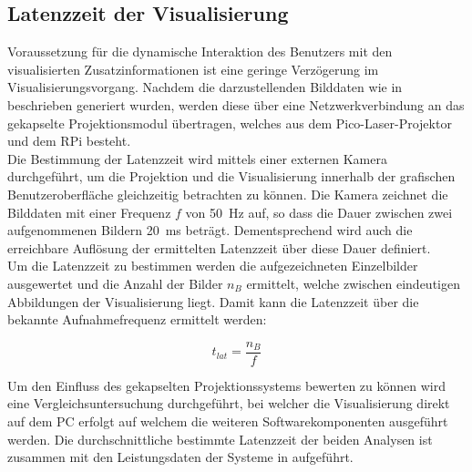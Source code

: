 

%

\subsection{Latenzzeit der Visualisierung}
Voraussetzung für die dynamische Interaktion des Benutzers mit den visualisierten Zusatzinformationen ist eine geringe Verzögerung im Visualisierungsvorgang. Nachdem die darzustellenden Bilddaten wie in  beschrieben generiert wurden, werden diese über eine Netzwerkverbindung  an das gekapselte Projektionsmodul übertragen, welches aus dem Pico-Laser-Projektor und dem RPi  besteht.\\

Die Bestimmung der Latenzzeit wird mittels einer externen Kamera durchgeführt, um die Projektion und die Visualisierung innerhalb der grafischen Benutzeroberfläche gleichzeitig betrachten zu können. Die Kamera zeichnet die Bilddaten mit einer Frequenz $f$ von \SI{50}{\Hz} auf, so dass die Dauer zwischen zwei aufgenommenen Bildern \SI{20}{\milli\second} beträgt. Dementsprechend wird auch die erreichbare Auflösung der ermittelten Latenzzeit über diese Dauer definiert.\\
Um die Latenzzeit zu bestimmen werden die aufgezeichneten Einzelbilder ausgewertet und die Anzahl der Bilder $n_B$ ermittelt, welche zwischen eindeutigen Abbildungen der Visualisierung liegt. Damit kann die Latenzzeit über die bekannte Aufnahmefrequenz ermittelt werden:

\begin{equation}
t_{lat} = \frac{n_B}{f}
\end{equation}

Um den Einfluss des gekapselten Projektionssystems bewerten zu können wird eine Vergleichsuntersuchung durchgeführt, bei welcher die Visualisierung direkt auf dem PC \red[Material!] erfolgt auf welchem die weiteren Softwarekomponenten ausgeführt werden. Die durchschnittliche bestimmte Latenzzeit der beiden Analysen ist zusammen mit den Leistungsdaten der Systeme in  aufgeführt.

